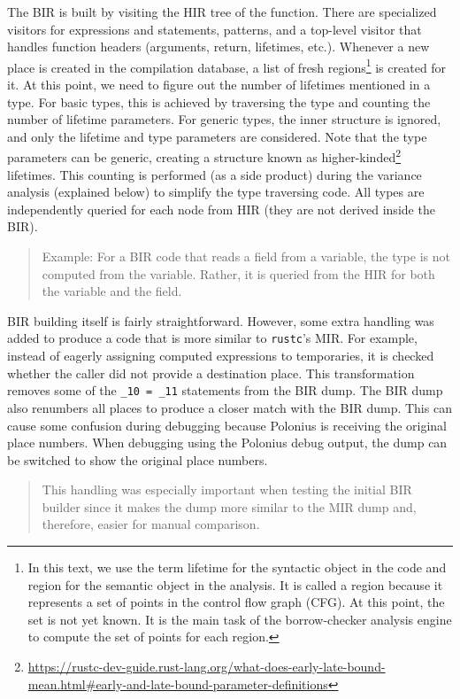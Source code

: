 \documentclass[
  11pt,
  twoside,symmetric]{report}
\DeclareRobustCommand{\href}[2]{#2\footnote{\url{#1}}}
\begin{document}
The BIR is built by visiting the HIR tree of the function. There are
specialized visitors for expressions and statements, patterns, and a
top-level visitor that handles function headers (arguments, return,
lifetimes, etc.). Whenever a new place is created in the compilation
database, a list of fresh regions\footnote{In this text, we use the term
  lifetime for the syntactic object in the code and region for the
  semantic object in the analysis. It is called a region because it
  represents a set of points in the control flow graph (CFG). At this
  point, the set is not yet known. It is the main task of the
  borrow-checker analysis engine to compute the set of points for each
  region.} is created for it. At this point, we need to figure out the
number of lifetimes mentioned in a type. For basic types, this is
achieved by traversing the type and counting the number of lifetime
parameters. For generic types, the inner structure is ignored, and only
the lifetime and type parameters are considered. Note that the type
parameters can be generic, creating a structure known as
\href{https://rustc-dev-guide.rust-lang.org/what-does-early-late-bound-mean.html\#early-and-late-bound-parameter-definitions}{higher-kinded}
lifetimes. This counting is performed (as a side product) during the
variance analysis (explained below) to simplify the type traversing
code. All types are independently queried for each node from HIR (they
are not derived inside the BIR).

\begin{quote}
Example: For a BIR code that reads a field from a variable, the type is
not computed from the variable. Rather, it is queried from the HIR for
both the variable and the field.
\end{quote}

BIR building itself is fairly straightforward. However, some extra
handling was added to produce a code that is more similar to
\texttt{rustc}'s MIR. For example, instead of eagerly assigning computed
expressions to temporaries, it is checked whether the caller did not
provide a destination place. This transformation removes some of the
\texttt{\_10\ =\ \_11} statements from the BIR dump. The BIR dump also
renumbers all places to produce a closer match with the BIR dump. This
can cause some confusion during debugging because Polonius is receiving
the original place numbers. When debugging using the Polonius debug
output, the dump can be switched to show the original place numbers.

\begin{quote}
This handling was especially important when testing the initial BIR
builder since it makes the dump more similar to the MIR dump and,
therefore, easier for manual comparison.
\end{quote}
\end{document}
